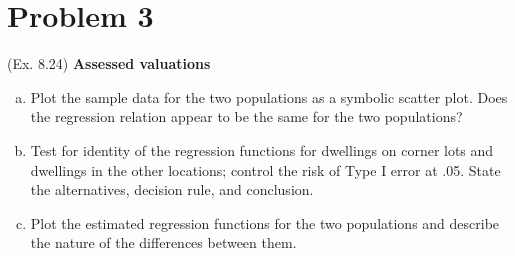 \documentclass[10pt]{report}
\begin{document}
\section*{Problem 3}
(Ex. 8.24) \textbf{Assessed valuations}
\begin{enumerate}[a.]
	\item 
	Plot the sample data for the two populations as a symbolic scatter plot. Does the regression relation appear to be the same for the two populations?
	
	\item 
	Test for identity of the regression functions for dwellings on corner lots and dwellings in the other locations; control the risk of Type I error at .05. State the alternatives, decision rule, and conclusion.
	
	\item 
	Plot the estimated regression functions for the two populations and describe the nature of the differences between them.
\end{enumerate}
\end{document}
